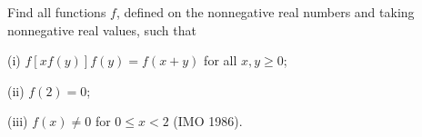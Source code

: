 Find all functions $f$, defined on the nonnegative real numbers and taking nonnegative real values, such that

(i) $f[xf(y)]f(y) = f(x + y)$ for all $x, y \geq 0$;

(ii) $f(2) = 0$;

(iii) $f(x) \neq 0$ for $0 \leq x < 2$ (IMO 1986).
